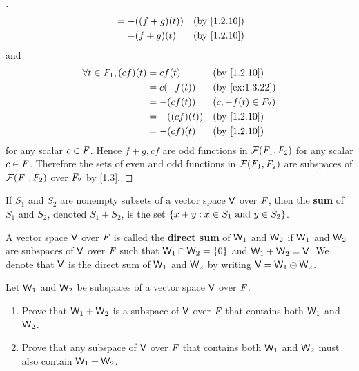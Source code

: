 \begin{proof}[]
\begin{align*}
                                   & = -((f + g)(t))  &  & \text{(by \cref{1.2.10})}    \\
                                   & = -(f + g)(t)    &  & \text{(by \cref{1.2.10})}
  \end{align*}
  and
  \begin{align*}
    \forall t \in \F_1, (cf)(t) & = cf(t)      &  & \text{(by \cref{1.2.10})}    \\
                                & = c(-f(t))   &  & \text{(by \cref{ex:1.3.22})} \\
                                & = -(cf(t))   &  & (c, -f(t) \in \F_2)          \\
                                & = -((cf)(t)) &  & \text{(by \cref{1.2.10})}    \\
                                & = -(cf)(t)   &  & \text{(by \cref{1.2.10})}
  \end{align*}
  for any scalar \(c \in \mathit{F}\).
  Hence \(f + g, cf\) are odd functions in \(\fs{\F_1}{\F_2}\) for any scalar \(c \in \mathit{F}\).
  Therefore the sets of even and odd functions in \(\fs{\F_1}{\F_2}\) are subspaces of \(\fs{\F_1}{\F_2}\) over \(\mathit{F}_2\) by \cref{1.3}.
\end{proof}

\begin{defn}\label{1.3.10}
  If \(S_1\) and \(S_2\) are nonempty subsets of a vector space \(\mathsf{V}\) over \(\mathit{F}\), then the \textbf{sum} of \(S_1\) and \(S_2\), denoted \(S_1 + S_2\), is the set \(\left\lbrace x + y : x \in S_1 \text{ and } y \in S_2\right\rbrace\).
\end{defn}

\begin{defn}\label{1.3.11}
  A vector space \(\mathsf{V}\) over \(\mathit{F}\) is called the \textbf{direct sum} of \(\mathsf{W}_1\) and \(\mathsf{W}_2\) if \(\mathsf{W}_1\) and \(\mathsf{W}_2\) are subspaces of \(\mathsf{V}\) over \(\mathit{F}\) such that \(\mathsf{W}_1 \cap \mathsf{W}_2 = \left\lbrace0\right\rbrace\) and \(\mathsf{W}_1 + \mathsf{W}_2 = \mathsf{V}\).
  We denote that \(\mathsf{V}\) is the direct sum of \(\mathsf{W}_1\) and \(\mathsf{W}_2\) by writing \(\mathsf{V} = \mathsf{W}_1 \oplus \mathsf{W}_2\).
\end{defn}

\begin{ex}\label{ex:1.3.23}
  Let \(\mathsf{W}_1\) and \(\mathsf{W}_2\) be subspaces of a vector space \(\mathsf{V}\) over \(\mathit{F}\).
  \begin{enumerate}
    \item Prove that \(\mathsf{W}_1 + \mathsf{W}_2\) is a subspace of \(\mathsf{V}\) over \(\mathit{F}\) that contains both \(\mathsf{W}_1\) and \(\mathsf{W}_2\).
    \item Prove that any subspace of \(\mathsf{V}\) over \(\mathit{F}\) that contains both \(\mathsf{W}_1\) and \(\mathsf{W}_2\) must also contain \(\mathsf{W}_1 + \mathsf{W}_2\).
  \end{enumerate}
\end{ex}

